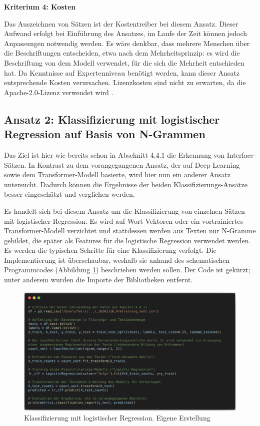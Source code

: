 {\bf Kriterium 4: Kosten}

Das Auszeichnen von Sätzen ist der Kostentreiber bei diesem Ansatz. Dieser Aufwand erfolgt bei Einführung des Ansatzes, im Laufe der Zeit können jedoch Anpassungen notwendig werden. Es wäre denkbar, dass mehrere Menschen über die Beschriftungen entscheiden, etwa nach dem Mehrheitsprinzip: es wird die Beschriftung von dem Modell verwendet, für die sich die Mehrheit entschieden hat. Da Kenntnisse auf Expertenniveau benötigt werden, kann dieser Ansatz entsprechende Kosten verursachen. Lizenzkosten sind nicht zu erwarten, da die Apache-2.0-Lizenz verwendet wird \cite{bert}.

\subsection{Ansatz 2: Klassifizierung mit logistischer Regression auf Basis von N-Grammen}

Das Ziel ist hier wie bereits schon in Abschnitt 4.4.1 die Erkennung von Interface-Sätzen. In Kontrast zu dem vorangegangenen Ansatz, der auf Deep Learning sowie dem Transformer-Modell basierte, wird hier nun ein anderer Ansatz untersucht. Dadurch können die Ergebnisse der beiden Klassifizierungs-Ansätze besser eingeschätzt und verglichen werden. 

Es handelt sich bei diesem Ansatz um die Klassifizierung von einzelnen Sätzen mit logistischer Regression. Es wird auf Wort-Vektoren oder ein vortrainiertes Transformer-Modell verzichtet und stattdessen werden aus Texten nur N-Gramme gebildet, die später als Features für die logistische Regression verwendet werden. Es werden die typischen Schritte \cite[S. 124]{Gupta} für eine Klassifizierung verfolgt. Die Implementierung ist überschaubar, weshalb sie anhand des schematischen Programmcodes (Abbildung \ref{Abbildung:lr-code}) beschrieben werden sollen. Der Code ist gekürzt; unter anderem wurden die Importe der Bibliotheken entfernt.

\begin{figure}[h]
\centering
\includegraphics[scale=0.45]{content/pics/Listing_2_.png}
\caption{Klassifizierung mit logistischer Regression. Eigene Erstellung}
\label{Abbildung:lr-code}
\end{figure}

